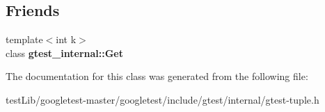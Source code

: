 \subsection*{Friends}
\begin{DoxyCompactItemize}
\item 
\mbox{\label{classstd_1_1tr1_1_1tuple_aeeed38755abdaa78587dd1eac9ccc950}} 
{\footnotesize template$<$int k$>$ }\\class {\bfseries gtest\+\_\+internal\+::\+Get}
\end{DoxyCompactItemize}


The documentation for this class was generated from the following file\+:\begin{DoxyCompactItemize}
\item 
test\+Lib/googletest-\/master/googletest/include/gtest/internal/gtest-\/tuple.\+h\end{DoxyCompactItemize}
